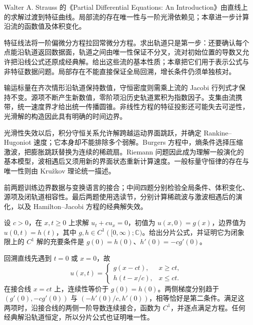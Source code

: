 \ProseParagraphBreak

Walter A. Strauss 的《Partial Differential Equations: An Introduction》\cite[Section 1.2]{Strauss2008Partial}由直线上的求解过渡到特征曲线。局部流的存在唯一性与一阶光滑依赖见；本章进一步计算沿流的函数值及体积变化。







\begin{chaptersummary}
特征线法将一阶偏微分方程拉回常微分方程。求出轨道只是第一步：还要确认每个点能沿轨道返回数据面，轨道之间由唯一性保证不分叉，流对初始位置的导数又允许把沿线公式还原成经典解。给出这些流的基本性质；本章把它们用于表示公式与非特征数据问题。局部存在不能直接保证全局回溯，增长条件仍须单独核对。

\ProseParagraphBreak

输运标量在齐次情形沿轨道保持数值，守恒密度则需乘上流的 Jacobi 行列式才保持不变。源项不断产生新数值，零阶项沿历史轨道累积为指数因子。支集由流携带，统一速度界才给出统一传播圆锥。非线性方程的特征投影还可能失去可逆性，光滑解的构造因此具有明确的时间边界。

\ProseParagraphBreak

光滑性失效以后，积分守恒关系允许解跨越运动界面跳跃，并确定 Rankine--Hugoniot 速度；它本身却不能排除多个弱解。Burgers 方程中，熵条件选择压缩激波，把膨胀跳跃替换为连续的稀疏扇。Riemann 问题因此成为理解一般演化的基本模型，波相遇后又须用新的界面状态重新计算速度。一般标量守恒律的存在与唯一性则由 Kružkov 理论统一描述。
\end{chaptersummary}

\BookExercises

前两题训练边界数据与变换语言的接合；中间四题分别检验全局条件、体积变化、源项及闭轨道相容性。最后两题使用选读节，分别计算稀疏波与激波相遇后的演化，以及 Hamilton--Jacobi 方程的经典解失效。

\begin{exercise}\label{b2:ex:07-inflow}
设 \(c>0\)，在 \(x,t\geq0\) 上求解 \(u_t+c u_x=0\)，初值为 \(u(x,0)=g(x)\)，边界值为 \(u(0,t)=h(t)\)，其中 \(g,h\in C^1([0,\infty);\mathbb C)\)。给出分片公式，并证明它为闭象限上的 \(C^1\) 解的充要条件是
\(g(0)=h(0)\)、\(h'(0)=-c g'(0)\)。
\end{exercise}
\begin{solution}
回溯直线先遇到 \(t=0\) 或 \(x=0\)，故
\[
 u(x,t)=\begin{cases}g(x-ct),&x\geq ct,\\h(t-x/c),&x\leq ct.\end{cases}
\]
在接合线 \(x=ct\) 上，连续性等价于 \(g(0)=h(0)\)。两侧梯度分别趋于 \((g'(0),-c g'(0))\) 与 \((-h'(0)/c,h'(0))\)，相等恰好是第二条件。满足这两项时，沿接合线的两侧一阶导数连续接合，函数为 \(C^1\)，并逐点满足方程。任何经典解沿轨道恒定，所以分片公式也证明唯一性。
\end{solution}

